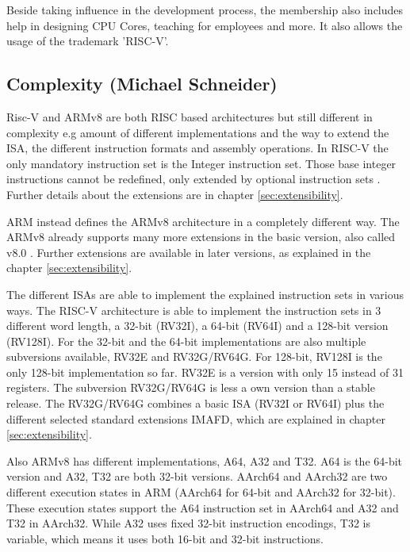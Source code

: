 \documentclass[conference]{IEEEtran}
\begin{document}
	Beside taking influence in the development process, the membership also includes help in designing \gls{CPU} Cores, teaching for employees and more. It also allows the usage of the trademark 'RISC-V'.

	\subsection{Complexity (Michael Schneider)}
	\label{complexity}
	Risc-V and ARMv8 are both \gls{RISC} based architectures but still different in complexity e.g amount of different implementations and the way to extend the \gls{ISA}, the different instruction formats and assembly operations. In RISC-V the only mandatory instruction set is the Integer instruction set. Those base integer instructions cannot be redefined, only extended by optional instruction sets \cite[page 3f]{Waterman2017}. Further details about the extensions are in chapter \ref{sec:extensibility}.
	
	ARM instead defines the ARMv8 architecture in a completely different way. The ARMv8 already supports many more extensions in the basic version, also called v8.0 \cite[page 60]{Arm2020}. Further extensions are available in later versions, as explained in the chapter \ref{sec:extensibility}.	

	The different \glspl{ISA} are able to implement the explained instruction sets in various ways.
	The RISC-V architecture is able to implement the instruction sets in 3 different word length, a 32-bit (RV32I), a 64-bit (RV64I) and a 128-bit version (RV128I).
	For the 32-bit and the 64-bit implementations are also multiple subversions available, RV32E and RV32G/RV64G. For 128-bit, RV128I is the only 128-bit implementation so far. RV32E is a version with only 15 instead of 31 registers. The subversion RV32G/RV64G is less a own version than a stable release. The RV32G/RV64G combines a basic \gls{ISA} (RV32I or RV64I) plus the different selected standard extensions IMAFD, which are explained in chapter \ref{sec:extensibility}. \cite[page 3ff]{Waterman2017} 

	Also ARMv8 has different implementations, A64, A32 and T32. A64 is the 64-bit version and A32, T32  are both 32-bit versions.
	AArch64 and AArch32 are two different execution states in ARM (AArch64 for 64-bit and AArch32 for 32-bit). These execution states support the A64 instruction set in AArch64 and A32 and T32 in AArch32. While A32 uses fixed 32-bit instruction encodings, T32 is variable, which means it uses both 16-bit and 32-bit instructions. \cite[page 38]{Arm2020}
	
\end{document}
